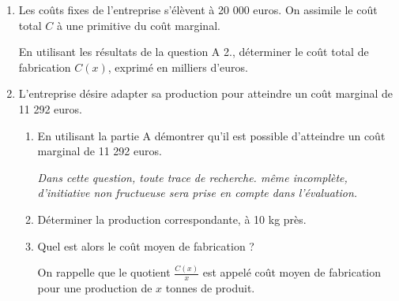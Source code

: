 \begin{enumerate}
     \item
     Les coûts fixes de l'entreprise s'élèvent à 20 000 euros. On assimile le coût total $C$ à une primitive du coût marginal.
     \par
     En utilisant les résultats de la question A  2., déterminer le coût total de fabrication $C\left(x\right)$, exprimé en milliers  d'euros.
     \item
     L'entreprise désire adapter sa production pour atteindre un coût marginal de 11 292 euros.
     \begin{enumerate}[label=\alph*.]
          \item
          En utilisant la partie A  démontrer qu'il est possible d'atteindre un coût marginal de 11 292 euros. 
\par\textit{Dans cette question, toute trace de recherche. même incomplète,  d'initiative non fructueuse sera prise en compte dans l'évaluation.}
          \item
          Déterminer la production correspondante, à 10 kg près.
          \item
          Quel est alors le coût moyen de fabrication ?
          \par
          On rappelle que le quotient $\frac{C\left(x\right)}{x}$ est appelé coût moyen de fabrication pour une production de $x$ tonnes de produit.
     \end{enumerate}
\end{enumerate}
